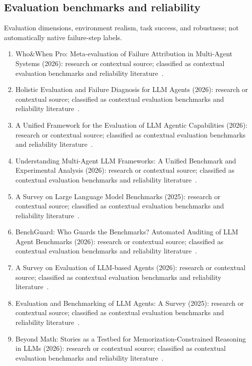 \subsection{Evaluation benchmarks and reliability}
Evaluation dimensions, environment realism, task success, and robustness; not automatically native failure-step labels.
\begin{enumerate}
\setlength{\itemsep}{1pt}\setlength{\parskip}{0pt}
\footnotesize
\item {Who\&When Pro}: Meta-evaluation of Failure Attribution in Multi-Agent Systems (2026): research or contextual source; classified as contextual evaluation benchmarks and reliability literature~\cite{ext003}.
\item Holistic Evaluation and Failure Diagnosis for {LLM} Agents (2026): research or contextual source; classified as contextual evaluation benchmarks and reliability literature~\cite{ext006}.
\item A Unified Framework for the Evaluation of {LLM} Agentic Capabilities (2026): research or contextual source; classified as contextual evaluation benchmarks and reliability literature~\cite{ext029}.
\item Understanding Multi-Agent {LLM} Frameworks: A Unified Benchmark and Experimental Analysis (2026): research or contextual source; classified as contextual evaluation benchmarks and reliability literature~\cite{ext030}.
\item A Survey on Large Language Model Benchmarks (2025): research or contextual source; classified as contextual evaluation benchmarks and reliability literature~\cite{ext031}.
\item {BenchGuard}: Who Guards the Benchmarks? Automated Auditing of {LLM} Agent Benchmarks (2026): research or contextual source; classified as contextual evaluation benchmarks and reliability literature~\cite{ext036}.
\item A Survey on Evaluation of {LLM}-based Agents (2026): research or contextual source; classified as contextual evaluation benchmarks and reliability literature~\cite{ext038}.
\item Evaluation and Benchmarking of {LLM} Agents: A Survey (2025): research or contextual source; classified as contextual evaluation benchmarks and reliability literature~\cite{ext039}.
\item Beyond Math: Stories as a Testbed for Memorization-Constrained Reasoning in {LLM}s (2026): research or contextual source; classified as contextual evaluation benchmarks and reliability literature~\cite{ext060}.

\end{enumerate}
